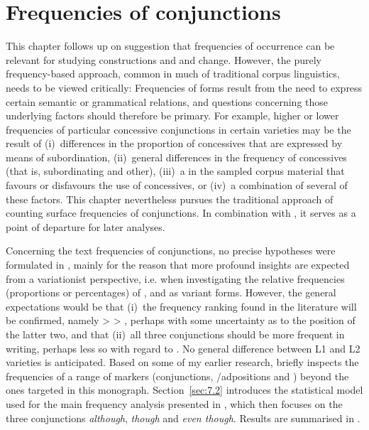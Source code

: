 \chapter{Frequencies of conjunctions}\label{ch:7}\label{bkm:Ref1727395}\label{bkm:Ref41324909}\label{bkm:Ref50992543}\label{sec:7}

This chapter follows up on  suggestion that frequencies of occurrence can be relevant for studying constructions and  and change. However, the purely frequency-based approach, common in much of traditional corpus linguistics, needs to be viewed critically: Frequencies of forms result from the need to express certain semantic or grammatical relations, and questions concerning those underlying factors should therefore be primary. For example, higher or lower frequencies of particular concessive conjunctions in certain varieties may be the result of
(i)~differences in the proportion of concessives that are expressed by means of subordination,
(ii)~general differences in the frequency of concessives (that is, subordinating and other),
(iii)~a  in the sampled corpus material that favours or disfavours the use of concessives, or
(iv)~a combination of several of these factors. This chapter nevertheless pursues the traditional approach of counting surface frequencies of conjunctions. In combination with , it serves as a point of departure for later analyses.

  Concerning the text frequencies of conjunctions, no precise hypotheses were formulated in , mainly for the reason that more profound insights are expected from a variationist perspective, i.e. when investigating the relative frequencies (proportions or percentages) of ,  and  as variant forms. However, the general expectations would be that
(i)~the frequency ranking found in the literature will be confirmed, namely  >  > , perhaps with some uncertainty as to the position of the latter two, and that
(ii)~all three conjunctions should be more frequent in writing, perhaps less so with regard to . No general difference between L1 and L2 varieties is anticipated. Based on some of my earlier research,  briefly inspects the frequencies of a range of markers (conjunc\-tions, /adpositions and ) beyond the ones targeted in this monograph. Section~\ref{sec:7.2} introduces the statistical model used for the main frequency analysis presented in , which then focuses on the three conjunctions \textit{although}, \textit{though} and \textit{even though}. Results are summarised in .

